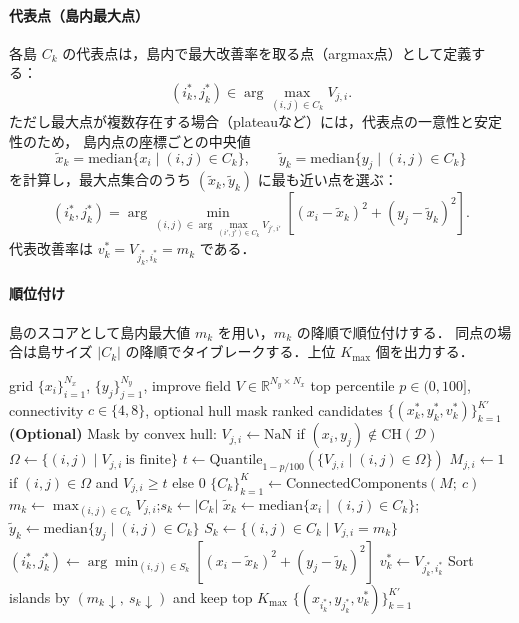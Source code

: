 \paragraph{代表点（島内最大点）}
各島 $C_k$ の代表点は，島内で最大改善率を取る点（argmax点）として定義する：
\[
(i_k^\ast,j_k^\ast)\in \arg\max_{(i,j)\in C_k} V_{j,i}.
\]
ただし最大点が複数存在する場合（plateauなど）には，代表点の一意性と安定性のため，
島内点の座標ごとの中央値
\[
\tilde{x}_k=\mathrm{median}\{x_i\mid (i,j)\in C_k\},\qquad
\tilde{y}_k=\mathrm{median}\{y_j\mid (i,j)\in C_k\}
\]
を計算し，最大点集合のうち $(\tilde{x}_k,\tilde{y}_k)$ に最も近い点を選ぶ：
\[
(i_k^\ast,j_k^\ast)=
\arg\min_{(i,j)\in \arg\max_{(i',j')\in C_k} V_{j',i'}}\left[(x_i-\tilde{x}_k)^2+(y_j-\tilde{y}_k)^2\right].
\]
代表改善率は $v_k^\ast=V_{j_k^\ast,i_k^\ast}=m_k$ である．

\paragraph{順位付け}
島のスコアとして島内最大値 $m_k$ を用い，$m_k$ の降順で順位付けする．
同点の場合は島サイズ $|C_k|$ の降順でタイブレークする．上位 $K_{\max}$ 個を出力する．

\begin{algorithm}[t]
\caption{2D改善率場からの複数最適条件抽出（top-pct near-optimal set，島内最大点）}
\label{alg:optima-top-pct-argmax}
\begin{algorithmic}[1]
\Require grid $\{x_i\}_{i=1}^{N_x}$, $\{y_j\}_{j=1}^{N_y}$, improve field $V\in\mathbb{R}^{N_y\times N_x}$
\Require top percentile $p\in(0,100]$, connectivity $c\in\{4,8\}$, optional hull mask
\Ensure ranked candidates $\{(x_k^\ast,y_k^\ast,v_k^\ast)\}_{k=1}^{K'}$
\State \textbf{(Optional)} Mask by convex hull: $V_{j,i}\gets \mathrm{NaN}$ if $(x_i,y_j)\notin \mathrm{CH}(\mathcal{D})$
\State $\Omega\gets \{(i,j)\mid V_{j,i}\ \text{is finite}\}$
\State $t \gets \mathrm{Quantile}_{1-p/100}(\{V_{j,i}\mid (i,j)\in\Omega\})$
\State $M_{j,i}\gets 1$ if $(i,j)\in\Omega$ and $V_{j,i}\ge t$ else $0$
\State $\{C_k\}_{k=1}^{K} \gets \mathrm{ConnectedComponents}(M;\ c)$
  \State $m_k\gets \max_{(i,j)\in C_k} V_{j,i}$;\quad $s_k\gets |C_k|$
  \State $\tilde{x}_k\gets \mathrm{median}\{x_i\mid (i,j)\in C_k\}$;\quad
         $\tilde{y}_k\gets \mathrm{median}\{y_j\mid (i,j)\in C_k\}$
  \State $S_k \gets \{(i,j)\in C_k \mid V_{j,i}=m_k\}$ 
  \State $(i_k^\ast,j_k^\ast)\gets \arg\min_{(i,j)\in S_k}\left[(x_i-\tilde{x}_k)^2+(y_j-\tilde{y}_k)^2\right]$
  \State $v_k^\ast\gets V_{j_k^\ast,i_k^\ast}$ 
\EndFor
\State Sort islands by $(m_k \downarrow,\ s_k \downarrow)$ and keep top $K_{\max}$
\State \Return $\{(x_{i_k^\ast},y_{j_k^\ast},v_k^\ast)\}_{k=1}^{K'}$
\end{algorithmic}
\end{algorithm}



